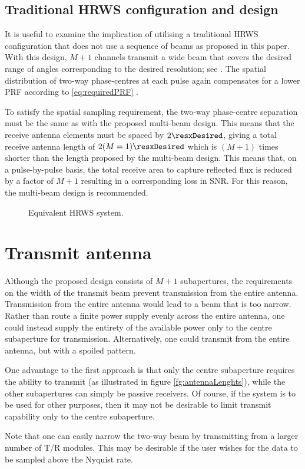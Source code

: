 \subsection{Traditional HRWS configuration and design}
It is useful to examine the implication of utilising a traditional HRWS configuration that does not use a sequence of beams as proposed in this paper. With this design, $M+1$ channels transmit a wide beam that covers the desired range of angles corresponding to the desired resolution; see . The spatial distribution of two-way phase-centres at each pulse again compensates for a lower PRF according to \eqref{eq:requiredPRF} \cite{GebertPHD}.
\par
To satisfy the spatial sampling requirement, the two-way phase-centre separation must be the same as with the proposed multi-beam design. This means that the receive antenna elements must be spaced by $2\resxDesired$, giving a total receive antenna length of $2(M=1)\resxDesired$ which is $(M+1)$ times shorter than the length proposed by the multi-beam design. This means that, on a pulse-by-pulse basis, the total receive area to capture reflected flux is reduced by a factor of $M+1$ resulting in a corresponding loss in SNR. For this reason, the multi-beam design is recommended.
\begin{figure}[h!]
\begin{center}
 \resizebox{1.0\columnwidth}{!}{}
 \caption{Equivalent HRWS system.}
 \label{fg:equivHRWS}
 \end{center}
\end{figure}
\section{Transmit antenna}
Although the proposed design consists of $M+1$ subapertures, the requirements on the width of the transmit beam prevent transmission from the entire antenna. Transmission from the entire antenna would lead to a beam that is too narrow. Rather than route a finite power supply evenly across the entire antenna, one could instead supply the entirety of the available power only to the centre subaperture for transmission. Alternatively, one could transmit from the entire antenna, but with a spoiled pattern.
\par
One advantage to the first approach is that only the centre subaperture requires the ability to transmit (as illustrated in figure \ref{fg:antennaLenghts}), while the other subapertures can simply be passive receivers. Of course, if the system is to be used for other purposes, then it may not be desirable to limit transmit capability only to the centre subaperture.
\par
Note that one can easily narrow the two-way beam by transmitting from a larger number of T/R modules. This may be desirable if the user wishes for the data to be sampled above the Nyquist rate.